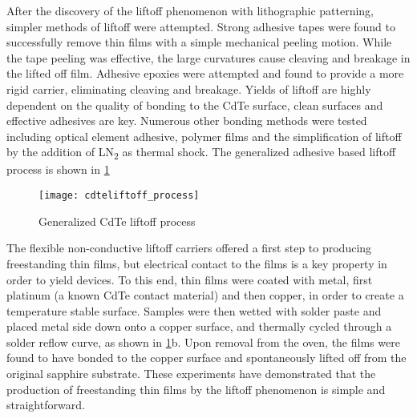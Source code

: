 After the discovery of the liftoff phenomenon with lithographic patterning, simpler methods of liftoff were attempted.
Strong adhesive tapes were found to successfully remove thin films with a simple mechanical peeling motion.
While the tape peeling was effective, the large curvatures cause cleaving and breakage in the lifted off film.
Adhesive epoxies were attempted and found to provide a more rigid carrier, eliminating cleaving and breakage.
Yields of liftoff are highly dependent on the quality of bonding to the CdTe surface, clean surfaces and effective adhesives are key.
Numerous other bonding methods were tested including optical element adhesive, polymer films and the simplification of liftoff by the addition of LN\textsubscript{2} as thermal shock.
The generalized adhesive based liftoff process is shown in \cref{fig:cdteliftoff_process}
\begin{figure}
 \centering \texttt{[image: cdteliftoff\_process]}
 \caption{\label{fig:cdteliftoff_process}Generalized CdTe liftoff process}
\end{figure}
The flexible non-conductive liftoff carriers offered a first step to producing freestanding thin films, but electrical contact to the films is a key property in order to yield devices.
To this end, thin films were coated with metal, first platinum (a known CdTe contact material) and then copper, in order to create a temperature stable surface.
Samples were then wetted with solder paste and placed metal side down onto a copper surface, and thermally cycled through a solder reflow curve, as shown in \cref{fig:cdteliftoff_process}b.
Upon removal from the oven, the films were found to have bonded to the copper surface and spontaneously lifted off from the original sapphire substrate.
These experiments have demonstrated that the production of freestanding thin films by the liftoff phenomenon is simple and straightforward.

